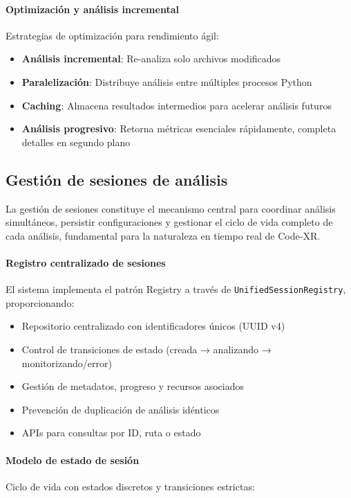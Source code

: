 \documentclass[a4paper, 12pt]{book}
\begin{document}
\paragraph{Optimización y análisis incremental}
Estrategias de optimización para rendimiento ágil:

\begin{itemize}
  \item \textbf{Análisis incremental}: Re-analiza solo archivos modificados
  \item \textbf{Paralelización}: Distribuye análisis entre múltiples procesos Python
  \item \textbf{Caching}: Almacena resultados intermedios para acelerar análisis futuros
  \item \textbf{Análisis progresivo}: Retorna métricas esenciales rápidamente, completa detalles en segundo plano
\end{itemize}

\subsection{Gestión de sesiones de análisis}
\label{sec:gestion-sesiones}

La gestión de sesiones constituye el mecanismo central para coordinar análisis simultáneos, persistir configuraciones y gestionar el ciclo de vida completo de cada análisis, fundamental para la naturaleza en tiempo real de Code-XR.

\paragraph{Registro centralizado de sesiones}
El sistema implementa el patrón Registry a través de \texttt{UnifiedSessionRegistry}, proporcionando:

\begin{itemize}
  \item Repositorio centralizado con identificadores únicos (UUID v4)
  \item Control de transiciones de estado (creada → analizando → monitorizando/error)
  \item Gestión de metadatos, progreso y recursos asociados
  \item Prevención de duplicación de análisis idénticos
  \item APIs para consultas por ID, ruta o estado
\end{itemize}

\paragraph{Modelo de estado de sesión}
Ciclo de vida con estados discretos y transiciones estrictas:
\end{document}
